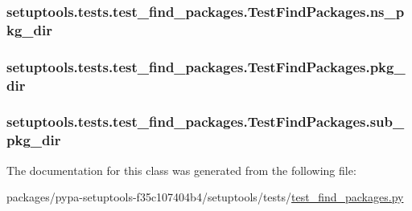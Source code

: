 \subsubsection[{ns\+\_\+pkg\+\_\+dir}]{\setlength{\rightskip}{0pt plus 5cm}setuptools.\+tests.\+test\+\_\+find\+\_\+packages.\+Test\+Find\+Packages.\+ns\+\_\+pkg\+\_\+dir}\label{classsetuptools_1_1tests_1_1test__find__packages_1_1TestFindPackages_af41824a5beddbb70746ce6617b45d306}
\hypertarget{classsetuptools_1_1tests_1_1test__find__packages_1_1TestFindPackages_a73dfa577c3a473bc4afba55388e7d20f}{}
\subsubsection[{pkg\+\_\+dir}]{\setlength{\rightskip}{0pt plus 5cm}setuptools.\+tests.\+test\+\_\+find\+\_\+packages.\+Test\+Find\+Packages.\+pkg\+\_\+dir}\label{classsetuptools_1_1tests_1_1test__find__packages_1_1TestFindPackages_a73dfa577c3a473bc4afba55388e7d20f}
\hypertarget{classsetuptools_1_1tests_1_1test__find__packages_1_1TestFindPackages_a25b3fdb431f0ee496398184f69d4122a}{}
\subsubsection[{sub\+\_\+pkg\+\_\+dir}]{\setlength{\rightskip}{0pt plus 5cm}setuptools.\+tests.\+test\+\_\+find\+\_\+packages.\+Test\+Find\+Packages.\+sub\+\_\+pkg\+\_\+dir}\label{classsetuptools_1_1tests_1_1test__find__packages_1_1TestFindPackages_a25b3fdb431f0ee496398184f69d4122a}


The documentation for this class was generated from the following file\+:\begin{DoxyCompactItemize}
\item 
packages/pypa-\/setuptools-\/f35c107404b4/setuptools/tests/\hyperlink{test__find__packages_8py}{test\+\_\+find\+\_\+packages.\+py}\end{DoxyCompactItemize}
